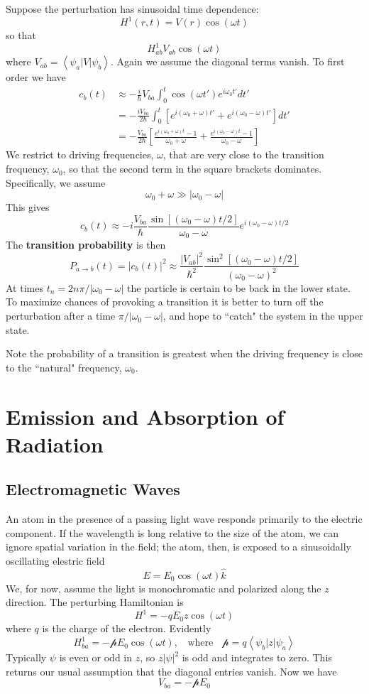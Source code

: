 \documentclass[12pt, a4paper, oneside, openright, titlepage]{book}
\newcommand{\brkt}[1]{\left\langle #1\right\rangle}
\begin{document}
Suppose the perturbation has sinusoidal time dependence: $$H^1(r,t) = V(r)\cos(\omega t)$$
so that $$H_{ab}^1V_{ab}\cos(\omega t)$$
where $V_{ab} = \brkt{\psi_a|V|\psi_b}$. Again we assume the diagonal terms vanish. To first order we have \begin{align*}
    c_b(t) &\approx -\frac{i}{\hbar}V_{ba}\int_0^t\cos(\omega t')e^{i\omega_0t'}dt' \\
    &= -\frac{iV_{ba}}{2\hbar}\int_0^t\left[e^{i(\omega_0+\omega)t'}+e^{i(\omega_0-\omega)t'}\right]dt' \\
    &= -\frac{V_{ba}}{2\hbar}\left[\frac{e^{i(\omega_0+\omega)t}-1}{\omega_0+\omega}+\frac{e^{i(\omega_0-\omega)t}-1}{\omega_0-\omega}\right]
\end{align*}
We restrict to driving frequencies, $\omega$, that are very close to the transition frequency, $\omega_0$, so that the second term in the square brackets dominates. Specifically, we assume $$\omega_0+\omega \gg |\omega_0-\omega|$$
This gives $$c_b(t) \approx -i\frac{V_{ba}}{\hbar}\frac{\sin[(\omega_0-\omega)t/2]}{\omega_0-\omega}e^{i(\omega_0-\omega)t/2}$$
The \textbf{transition probability} is then $$P_{a\rightarrow b}(t) = |c_b(t)|^2 \approx \frac{|V_{ab}|^2}{\hbar^2}\frac{\sin^2[(\omega_0-\omega)t/2]}{(\omega_0-\omega)^2}$$
At times $t_n = 2n\pi/|\omega_0-\omega|$ the particle is certain to be back in the lower state. To maximize chances of provoking a transition it is better to turn off the perturbation after a time $\pi/|\omega_0-\omega|$, and hope to ``catch" the system in the upper state.

Note the probability of a transition is greatest when the driving frequency is close to the ``natural" frequency, $\omega_0$. 

\section{Emission and Absorption of Radiation}

\subsection{Electromagnetic Waves}

An atom in the presence of a passing light wave responds primarily to the electric component. If the wavelength is long relative to the size of the atom, we can ignore spatial variation in the field; the atom, then, is exposed to a sinusoidally oscillating elestric field $$E = E_0\cos(\omega t)\hat{k}$$
We, for now, assume the light is monochromatic and polarized along the $z$ direction. The perturbing Hamiltonian is $$H^1=-qE_0z\cos(\omega t)$$
where $q$ is the charge of the electron. Evidently $$H_{ba}^1 = -\mathcal{p}E_0\cos(\omega t),\;\;\text{ where }\;\;\mathcal{p} = q\brkt{\psi_b|z|\psi_a}$$
Typically $\psi$ is even or odd in $z$, so $z|\psi|^2$ is odd and integrates to zero. This returns our usual assumption that the diagonal entries vanish. Now we have $$V_{ba} = -\mathcal{p}E_0$$
\end{document}
